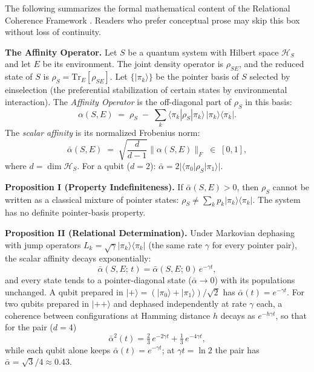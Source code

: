 
\begin{tcolorbox}[
  title={The Formal Mathematics: For Readers Who Want It},
  colback=gray!5,
  colframe=gray!50,
  fonttitle=\bfseries,
  breakable
]

The following summarizes the formal mathematical content of the Relational Coherence Framework \citep{AdamsRCT}. Readers who prefer conceptual prose may skip this box without loss of continuity.

\textbf{The Affinity Operator.} Let $S$ be a quantum system with Hilbert space $\mathcal{H}_S$ and let $E$ be its environment. The joint density operator is $\rho_{SE}$, and the reduced state of $S$ is $\rho_S = \mathrm{Tr}_E[\rho_{SE}]$. Let $\{|\pi_k\rangle\}$ be the pointer basis of $S$ selected by einselection (the preferential stabilization of certain states by environmental interaction). The \emph{Affinity Operator} is the off-diagonal part of $\rho_S$ in this basis:
$$\alpha(S,E) \;=\; \rho_S \;-\; \sum_k \langle \pi_k | \rho_S | \pi_k \rangle \, |\pi_k\rangle\langle\pi_k|.$$
The \emph{scalar affinity} is its normalized Frobenius norm:
$$\bar{\alpha}(S,E) \;=\; \sqrt{\frac{d}{d-1}} \|\alpha(S,E)\|_F \;\in\; [0,1],$$
where $d = \dim \mathcal{H}_S$. For a qubit ($d = 2$): $\bar{\alpha} = 2|\langle\pi_0|\rho_S|\pi_1\rangle|$.

\textbf{Proposition I (Property Indefiniteness).} If $\bar{\alpha}(S,E) > 0$, then $\rho_S$ cannot be written as a classical mixture of pointer states: $\rho_S \neq \sum_k p_k |\pi_k\rangle\langle\pi_k|$. The system has no definite pointer-basis property.

\textbf{Proposition II (Relational Determination).} Under Markovian dephasing with jump operators $L_k = \sqrt{\gamma}|\pi_k\rangle\langle\pi_k|$ (the same rate $\gamma$ for every pointer pair), the scalar affinity decays exponentially:
$$\bar{\alpha}(S,E;\,t) = \bar{\alpha}(S,E;\,0)\,e^{-\gamma t},$$
and every state tends to a pointer-diagonal state ($\bar{\alpha} \to 0$) with its populations unchanged. A qubit prepared in $|+\rangle = (|\pi_0\rangle + |\pi_1\rangle)/\sqrt{2}$ has $\bar{\alpha}(t) = e^{-\gamma t}$. For two qubits prepared in $|{+}{+}\rangle$ and dephased independently at rate $\gamma$ each, a coherence between configurations at Hamming distance $h$ decays as $e^{-h\gamma t}$, so that for the pair ($d = 4$)
$$\bar{\alpha}^2(t) = \tfrac{2}{3}\,e^{-2\gamma t} + \tfrac{1}{3}\,e^{-4\gamma t},$$
while each qubit alone keeps $\bar{\alpha}(t) = e^{-\gamma t}$; at $\gamma t = \ln 2$ the pair has $\bar{\alpha} = \sqrt{3}/4 \approx 0.43$.


\end{tcolorbox}

